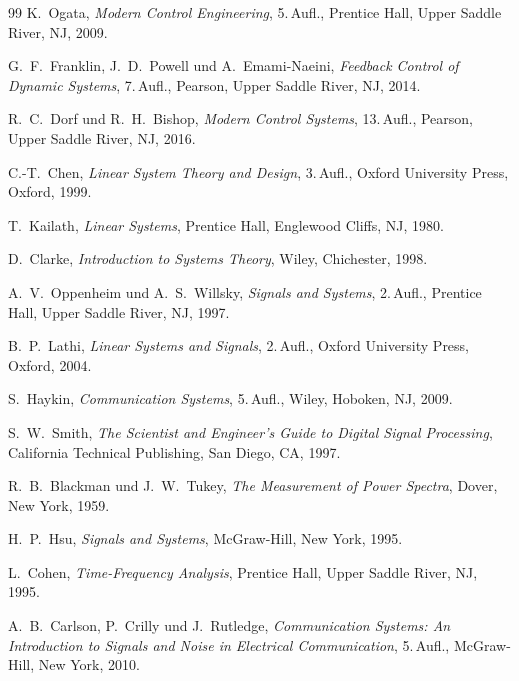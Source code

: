 \documentclass[a4paper, 12pt, twoside, openright]{report}
\theoremstyle{definition}
\theoremstyle{definition}
\begin{document}
\begin{thebibliography}{99}
	K.~Ogata,
	\textit{Modern Control Engineering},
	5.\,Aufl., Prentice Hall, Upper Saddle River, NJ, 2009.

	G.~F.~Franklin, J.~D.~Powell und A.~Emami-Naeini,
	\textit{Feedback Control of Dynamic Systems},
	7.\,Aufl., Pearson, Upper Saddle River, NJ, 2014.

	R.~C.~Dorf und R.~H.~Bishop,
	\textit{Modern Control Systems},
	13.\,Aufl., Pearson, Upper Saddle River, NJ, 2016.

	C.-T.~Chen,
	\textit{Linear System Theory and Design},
	3.\,Aufl., Oxford University Press, Oxford, 1999.

	T.~Kailath,
	\textit{Linear Systems},
	Prentice Hall, Englewood Cliffs, NJ, 1980.

	D.~Clarke,
	\textit{Introduction to Systems Theory},
	Wiley, Chichester, 1998.

	A.~V.~Oppenheim und A.~S.~Willsky,
	\textit{Signals and Systems},
	2.\,Aufl., Prentice Hall, Upper Saddle River, NJ, 1997.

	B.~P.~Lathi,
	\textit{Linear Systems and Signals},
	2.\,Aufl., Oxford University Press, Oxford, 2004.

	S.~Haykin,
	\textit{Communication Systems},
	5.\,Aufl., Wiley, Hoboken, NJ, 2009.

	S.~W.~Smith,
	\textit{The Scientist and Engineer's Guide to Digital Signal Processing},
	California Technical Publishing, San Diego, CA, 1997.

	R.~B.~Blackman und J.~W.~Tukey,
	\textit{The Measurement of Power Spectra},
	Dover, New York, 1959.

	H.~P.~Hsu,
	\textit{Signals and Systems},
	McGraw-Hill, New York, 1995.

	L.~Cohen,
	\textit{Time-Frequency Analysis},
	Prentice Hall, Upper Saddle River, NJ, 1995.

	A.~B.~Carlson, P.~Crilly und J.~Rutledge,
	\textit{Communication Systems: An Introduction to Signals and Noise in Electrical Communication},
	5.\,Aufl., McGraw-Hill, New York, 2010.


\end{thebibliography}
\end{document}
